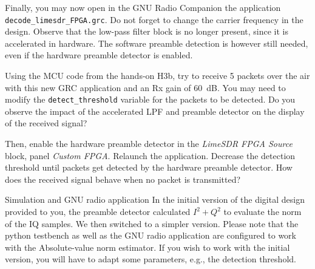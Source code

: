 Finally, you may now open in the GNU Radio Companion the application \texttt{decode\_limesdr\_FPGA.grc}. Do not forget to change the carrier frequency in the design. Observe that the low-pass filter block is no longer present, since it is accelerated in hardware. The software preamble detection is however still needed, even if the hardware preamble detector is enabled.

Using the MCU code from the hands-on H3b, try to receive 5 packets over the air with this new GRC application and an Rx gain of 60~dB. You may need to modify the \texttt{detect\_threshold} variable for the packets to be detected. Do you observe the impact of the accelerated LPF and preamble detector on the display of the received signal?

Then, enable the hardware preamble detector in the \textit{LimeSDR FPGA Source} block, panel \textit{Custom FPGA}. Relaunch the application. Decrease the detection threshold until packets get detected by the hardware preamble detector. How does the received signal behave when no packet is transmitted?

\begin{bclogo}[couleur = gray!20, arrondi = 0.2, logo=\bcinfo]{Simulation and GNU radio application}
In the initial version of the digital design provided to you, the preamble detector calculated $I^2+Q^2$ to evaluate the norm of the IQ samples. We then switched to a simpler version. Please note that the python testbench as well as the GNU radio application are configured to work with the Absolute-value norm estimator. If you wish to work with the initial version, you will have to adapt some parameters, e.g., the detection threshold.
\end{bclogo}
